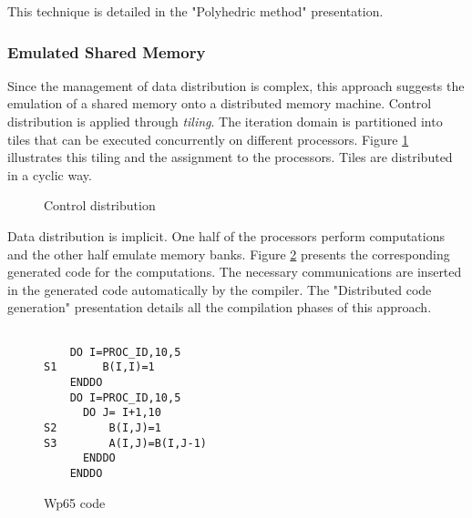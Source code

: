 This technique is detailed in the "Polyhedric method" presentation.

\subsubsection{Emulated Shared Memory}


Since the management of data  distribution is complex, this approach suggests
 the emulation of a shared memory onto a
distributed memory machine. Control distribution is applied through {\it 
tiling}. The iteration domain is partitioned into tiles that can be executed 
concurrently on different processors. Figure \ref{wp65d} illustrates this 
tiling and the assignment to the processors.  Tiles  are distributed in
 a cyclic way. 

\begin{figure}[htp]
\caption{Control distribution}
\label{wp65d}
\end{figure}


Data distribution is implicit.  One half of the processors perform
computations and the other half emulate memory banks.
Figure \ref{wp65c} presents the corresponding generated code for the 
computations. The necessary communications are inserted in the generated code 
automatically by the compiler. The "Distributed code generation" presentation 
 details all the compilation phases of this approach.


\begin{figure}[htp]
\begin{verbatim}

    DO I=PROC_ID,10,5
S1       B(I,I)=1
    ENDDO
    DO I=PROC_ID,10,5
      DO J= I+1,10
S2        B(I,J)=1
S3        A(I,J)=B(I,J-1)
      ENDDO
    ENDDO  
\end{verbatim}
\caption{Wp65 code}
\label{wp65c}
\end{figure}

%
